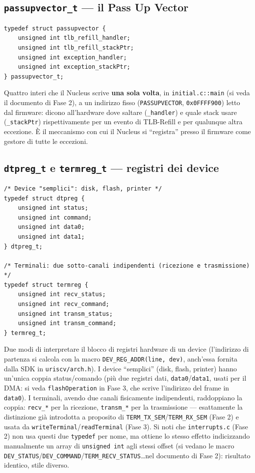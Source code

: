 \documentclass[11pt,a4paper]{article}
\newcommand{\code}[1]{\texttt{#1}}
\begin{document}
\subsection{\code{passupvector\_t} --- il Pass Up Vector}
\begin{lstlisting}
typedef struct passupvector {
    unsigned int tlb_refill_handler;
    unsigned int tlb_refill_stackPtr;
    unsigned int exception_handler;
    unsigned int exception_stackPtr;
} passupvector_t;
\end{lstlisting}
Quattro interi che il Nucleus scrive \textbf{una sola volta}, in
\code{initial.c::main} (si veda il documento di Fase 2), a un indirizzo
fisso (\code{PASSUPVECTOR}, \code{0x0FFFF900}) letto dal firmware: dicono
all'hardware dove saltare (\code{\_handler}) e quale stack usare
(\code{\_stackPtr}) rispettivamente per un evento di TLB-Refill e per
qualunque altra eccezione. \`E il meccanismo con cui il Nucleus si
``registra'' presso il firmware come gestore di tutte le eccezioni.

\subsection{\code{dtpreg\_t} e \code{termreg\_t} --- registri dei device}
\begin{lstlisting}
/* Device "semplici": disk, flash, printer */
typedef struct dtpreg {
    unsigned int status;
    unsigned int command;
    unsigned int data0;
    unsigned int data1;
} dtpreg_t;

/* Terminali: due sotto-canali indipendenti (ricezione e trasmissione) */
typedef struct termreg {
    unsigned int recv_status;
    unsigned int recv_command;
    unsigned int transm_status;
    unsigned int transm_command;
} termreg_t;
\end{lstlisting}
Due modi di interpretare il blocco di registri hardware di un device
(l'indirizzo di partenza si calcola con la macro \code{DEV\_REG\_ADDR(line,
dev)}, anch'essa fornita dalla SDK in \code{uriscv/arch.h}). I device
``semplici'' (disk, flash, printer) hanno un'unica coppia
status/comando (più due registri dati, \code{data0}/\code{data1}, usati
per il DMA: si veda \code{flashOperation} in Fase 3, che scrive l'indirizzo
del frame in \code{data0}). I terminali, avendo due canali fisicamente
indipendenti, raddoppiano la coppia: \code{recv\_*} per la ricezione,
\code{transm\_*} per la trasmissione --- esattamente la distinzione già
introdotta a proposito di \code{TERM\_TX\_SEM}/\code{TERM\_RX\_SEM}
(Fase 2) e usata da \code{writeTerminal}/\code{readTerminal} (Fase 3).
Si noti che \code{interrupts.c} (Fase 2) non usa questi due \code{typedef}
per nome, ma ottiene lo stesso effetto indicizzando manualmente un array
di \code{unsigned int} agli stessi offset (si vedano le macro
\code{DEV\_STATUS}/\code{DEV\_COMMAND}/\code{TERM\_RECV\_STATUS}\ldots nel
documento di Fase 2): risultato identico, stile diverso.
\end{document}
